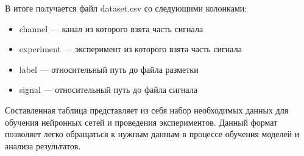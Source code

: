 В итоге получается файл dataset.csv со следующими колонками:

\begin{itemize}
	\item channel --- канал из которого взята часть сигнала
	\item experiment --- эксперимент из которого взята часть сигнала
	\item label --- относительный путь до файла разметки
	\item signal --- относительный путь до файла сигнала
\end{itemize}

\noindent Составленная таблица представляет из себя набор необходимых данных
для обучения нейронных сетей и проведения экспериментов. Данный формат
позволяет легко обращаться к нужным данным в процессе обучения моделей и
анализа результатов.
